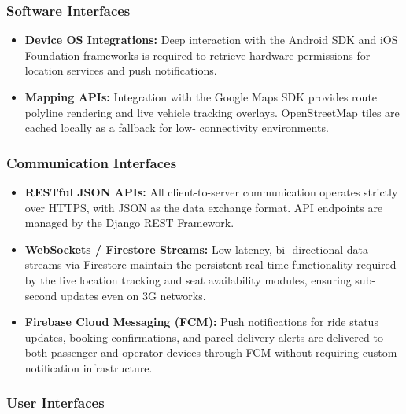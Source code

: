 \subsubsection{Software Interfaces}

\begin{itemize}
 \item \textbf{Device OS Integrations:} Deep interaction with the Android
SDK and iOS Foundation frameworks is required to retrieve hardware permissions
for location services and push notifications.

 \item \textbf{Mapping APIs:} Integration with the Google Maps SDK
provides route polyline rendering and live vehicle tracking overlays.
OpenStreetMap tiles are cached locally as a fallback for low- connectivity
environments.

\end{itemize}

\subsubsection{Communication Interfaces}

\begin{itemize}
 \item \textbf{RESTful JSON APIs:} All client-to-server communication
operates strictly over HTTPS, with JSON as the data exchange format. API
endpoints are managed by the Django REST Framework.

 \item \textbf{WebSockets / Firestore Streams:} Low-latency, bi-
directional data streams via Firestore maintain the persistent real-time
functionality required by the live location tracking and seat availability
modules, ensuring sub-second updates even on 3G networks.

 \item \textbf{Firebase Cloud Messaging (FCM):} Push notifications for
ride status updates, booking confirmations, and parcel delivery alerts are
delivered to both passenger and operator devices through FCM without requiring
custom notification infrastructure.

\end{itemize}

\subsubsection{User Interfaces}

